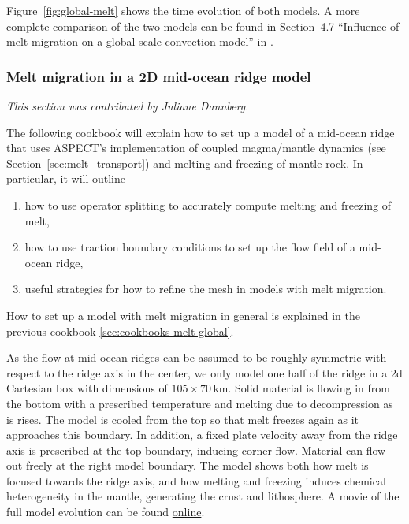 \documentclass{article}
\newcommand{\aspect}{\textsc{ASPECT}}
\begin{document}
Figure~\ref{fig:global-melt} shows the time evolution of both models.
A more complete comparison of the two models can be found in Section~4.7 ``Influence of melt migration on a global-scale
convection model'' in \cite{dannberg_melt}.

\subsubsection{Melt migration in a 2D mid-ocean ridge model}
\label{sec:cookbooks-mid-ocean-ridge}

\textit{This section was contributed by Juliane Dannberg.}

The following cookbook will explain how to set up a model of a mid-ocean ridge that uses \aspect{}'s
implementation of coupled magma/mantle dynamics (see Section~\ref{sec:melt_transport}) and melting
and freezing of mantle rock.
In particular, it will outline
\begin{enumerate}
  \item how to use operator splitting to accurately compute melting and freezing of melt,
  \item how to use traction boundary conditions to set up the flow field of a mid-ocean ridge,
  \item useful strategies for how to refine the mesh in models with melt migration.
\end{enumerate}
How to set up a model with melt migration in general is explained in the previous cookbook \ref{sec:cookbooks-melt-global}.

As the flow at mid-ocean ridges can be assumed to be roughly symmetric with respect to the ridge axis
in the center, we only model one half of the ridge in a 2d Cartesian box with dimensions of $105 \times 70$\,km. Solid material is flowing in from the bottom with a prescribed temperature and melting due to decompression as is rises. The model is cooled from the top so that melt freezes again as it approaches this boundary. In addition, a fixed plate velocity away from the ridge axis is prescribed at the top boundary, inducing corner flow. Material can flow out freely at the right model boundary. The model shows both how melt is focused towards the ridge axis, and how melting and freezing induces chemical heterogeneity in the mantle, generating the crust and lithosphere.
A movie of the full model evolution can be found \href{https://www.youtube.com/watch?v=f4Bc4lzdNP0}{online}.
\end{document}
